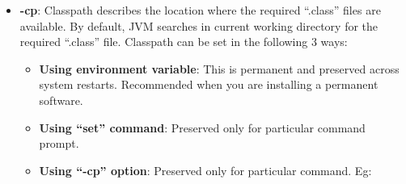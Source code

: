 \begin{flushleft}
\begin{itemize}
\begin{itemize}
			\bigskip
			\item \textbf{-cp}: Classpath describes the location where the required “.class” files are available. By default, JVM searches in current working directory for the required “.class” file. Classpath can be set in the following 3 ways:
			\begin{itemize}
				\item \textbf{Using environment variable}: This is permanent and  preserved across system restarts. Recommended when you are installing a permanent software.
				\item \textbf{Using “set” command}: Preserved only for particular command prompt.
				\bigskip
				\item \textbf{Using “-cp” option}: Preserved only for particular command. Eg:
				\bigskip
				\bigskip
			\end{itemize}				
		
		
		\end{itemize}	
	\end{itemize}
\end{flushleft}

\newpage
